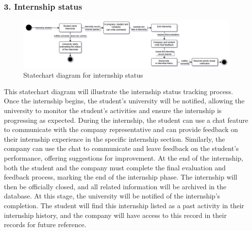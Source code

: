 \subsubsection{3. Internship status}\label{subsubsec:monitoring_student_activities}
\begin{figure}[H]
    \centering
    \includegraphics[width=1\textwidth]{Images/Internship_status.png}
    \caption{Statechart diagram for internship status}\label{fig:statechart_internship_status}
\end{figure}
This statechart diagram will illustrate the internship status tracking process. Once the internship begins, the student’s university will be notified, 
allowing the university to monitor the student’s activities and ensure the internship is progressing as expected.
During the internship, the student can use a chat feature to communicate with the company representative and can provide feedback on their internship experience 
in the specific internship section. Similarly, the company can use the chat to communicate and leave feedback on the student’s performance, offering suggestions
for improvement.
At the end of the internship, both the student and the company must complete the final evaluation and feedback process, marking the end of the internship phase.
The internship will then be officially closed, and all related information will be archived in the database. At this stage, the university will be notified
of the internship’s completion.
The student will find this internship listed as a past activity in their internship history, and the company will have access to this record in their records
 for future reference.

